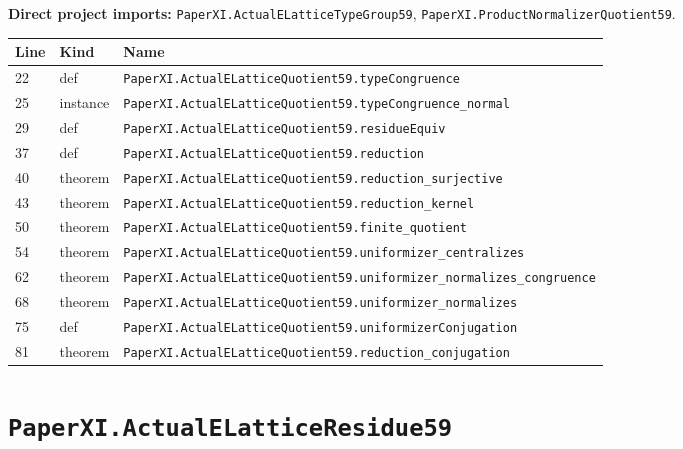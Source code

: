 \documentclass[10pt,oneside]{book}
\begin{document}
\textbf{Direct project imports:} \nolinkurl{PaperXI.ActualELatticeTypeGroup59}, \nolinkurl{PaperXI.ProductNormalizerQuotient59}.

\begin{longtable}{@{}p{}p{}p{}@{}}\toprule Line&Kind&Name\\\midrule\endhead

22&def&\nolinkurl{PaperXI.ActualELatticeQuotient59.typeCongruence}\\

25&instance&\nolinkurl{PaperXI.ActualELatticeQuotient59.typeCongruence_normal}\\

29&def&\nolinkurl{PaperXI.ActualELatticeQuotient59.residueEquiv}\\

37&def&\nolinkurl{PaperXI.ActualELatticeQuotient59.reduction}\\

40&theorem&\nolinkurl{PaperXI.ActualELatticeQuotient59.reduction_surjective}\\

43&theorem&\nolinkurl{PaperXI.ActualELatticeQuotient59.reduction_kernel}\\

50&theorem&\nolinkurl{PaperXI.ActualELatticeQuotient59.finite_quotient}\\

54&theorem&\nolinkurl{PaperXI.ActualELatticeQuotient59.uniformizer_centralizes}\\

62&theorem&\nolinkurl{PaperXI.ActualELatticeQuotient59.uniformizer_normalizes_congruence}\\

68&theorem&\nolinkurl{PaperXI.ActualELatticeQuotient59.uniformizer_normalizes}\\

75&def&\nolinkurl{PaperXI.ActualELatticeQuotient59.uniformizerConjugation}\\

81&theorem&\nolinkurl{PaperXI.ActualELatticeQuotient59.reduction_conjugation}\\

\bottomrule\end{longtable}

\section{\texorpdfstring{\nolinkurl{PaperXI.ActualELatticeResidue59}}{PaperXI.ActualELatticeResidue59}}\label{module:PaperXI.ActualELatticeResidue59}
\end{document}
